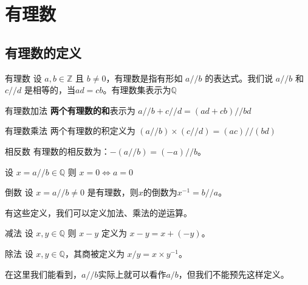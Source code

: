 \section{有理数}

\subsection{有理数的定义}\label{subsec:rational-numbers}

\begin{definition}{有理数}{}
	设 $a,b\in \mathbb Z$ 且 $b\ne 0$，有理数是指有形如 $a//b$ 的表达式。我们说 $a//b$ 和 $c//d$ 是相等的，当$ad=cb$。有理数集表示为$\mathbb Q$ 
\end{definition}

\begin{definition}{有理数加法}{}
	\textbf{两个有理数的和}表示为 $a//b + c//d =(ad+cb) // bd$
\end{definition}

\begin{definition}{有理数乘法}{}
	两个有理数的积定义为 $(a//b) \times (c//d) = (ac)//(bd)$
\end{definition}

\begin{definition}{相反数}{}
	有理数的相反数为：$-(a//b) = (-a)//b$。
\end{definition}

\begin{theorem}{}{}
	设 $x = a//b \in \mathbb Q$ 则 $x=0\iff a=0$
\end{theorem}

\begin{definition}{倒数}{}
	设 $x=a//b\ne 0$ 是有理数，则$x$的倒数为$x^{-1} = b//a$。
\end{definition}

\begin{note}
	有这些定义，我们可以定义加法、乘法的逆运算。
\end{note}

\begin{definition}{减法}{}
	设 $x,y\in \mathbb Q$ 则 $x-y$ 定义为 $x-y=x+(-y)$。
\end{definition}

\begin{definition}{除法}{}
	设 $x,y\in \mathbb{Q}$，其商被定义为 $x/y = x\times y^{-1}$。
\end{definition}

\begin{note}
	在这里我们能看到，$a//b$实际上就可以看作$a/b$，但我们不能预先这样定义。
\end{note}

